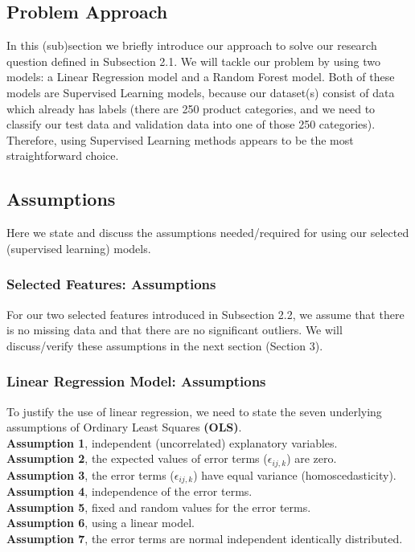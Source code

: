 \subsection{Problem Approach}
In this (sub)section we briefly introduce our approach to solve our research
question defined in Subsection 2.1. We will tackle our problem by using two
models: a Linear Regression model and a Random Forest model. Both of these
models are Supervised Learning models, because our dataset(s) consist of data
which already has labels (there are 250 product categories, and we need to
classify our test data and validation data into one of those 250 categories).
Therefore, using Supervised Learning methods appears to be the most
straightforward choice.

\subsection{Assumptions}
Here we state and discuss the assumptions needed/required for using our selected
(supervised learning) models.

\subsubsection{Selected Features: Assumptions}
For our two selected features introduced in Subsection 2.2, we assume that there
is no missing data and that there are no significant outliers. We will
discuss/verify these assumptions in the next section (Section 3).

\subsubsection{Linear Regression Model: Assumptions}
To justify the use of linear regression, we need to state the seven underlying
assumptions of Ordinary Least Squares \textbf{(OLS)}. \\
\textbf{Assumption 1}, independent (uncorrelated) explanatory variables. \\
\textbf{Assumption 2}, the expected values of error terms ($\epsilon_{ij,k}$) are zero. \\
\textbf{Assumption 3}, the error terms ($\epsilon_{ij,k}$) have equal variance
(homoscedasticity). \\
\textbf{Assumption 4}, independence of the error terms. \\
\textbf{Assumption 5}, fixed and random values for the error terms. \\
\textbf{Assumption 6}, using a linear model. \\
\textbf{Assumption 7}, the error terms are normal independent identically
distributed.

